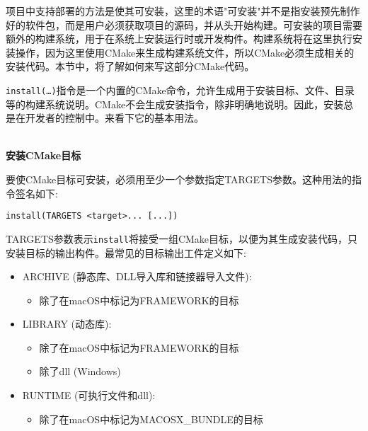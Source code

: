 项目中支持部署的方法是使其可安装，这里的术语"可安装"并不是指安装预先制作好的软件包，而是用户必须获取项目的源码，并从头开始构建。可安装的项目需要额外的构建系统，用于在系统上安装运行时或开发构件。构建系统将在这里执行安装操作，因为这里使用CMake来生成构建系统文件，所以CMake必须生成相关的安装代码。本节中，将了解如何来写这部分CMake代码。


\texttt{install(…)}指令是一个内置的CMake命令，允许生成用于安装目标、文件、目录等的构建系统说明。CMake不会生成安装指令，除非明确地说明。因此，安装总是在开发者的控制中。来看下它的基本用法。

\hspace*{\fill} \\ %
\noindent
\textbf{安装CMake目标}

要使CMake目标可安装，必须用至少一个参数指定TARGETS参数。这种用法的指令签名如下:

\begin{lstlisting}[style=styleCMake]
install(TARGETS <target>... [...])
\end{lstlisting}

TARGETS参数表示\texttt{install}将接受一组CMake目标，以便为其生成安装代码，只安装目标的输出构件。最常见的目标输出工件定义如下:

\begin{itemize}
\item 
ARCHIVE (静态库、DLL导入库和链接器导入文件):

\begin{itemize}
\item 
除了在macOS中标记为FRAMEWORK的目标
\end{itemize}

\item 
LIBRARY (动态库):

\begin{itemize}
\item 
除了在macOS中标记为FRAMEWORK的目标

\item 
除了dll (Windows)
\end{itemize}

\item 
RUNTIME (可执行文件和dll):

\begin{itemize}
\item 
除了在macOS中标记为MACOSX\_BUNDLE的目标
\end{itemize}
\end{itemize}

